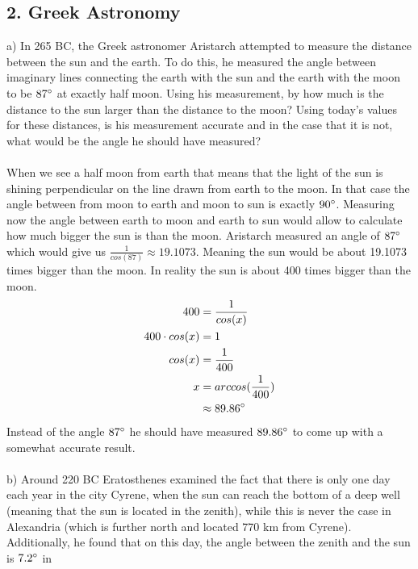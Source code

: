 \subsection*{2. Greek Astronomy}

a) In 265 BC, the Greek astronomer Aristarch attempted to measure the distance between the sun and the
earth. To do this, he measured the angle between imaginary lines connecting the earth with the sun and the
earth with the moon to be $87 \degree$ at exactly half moon. Using his measurement, by how much is the
distance to the sun larger than the distance to the moon? Using today's values for these distances, is his
measurement accurate and in the case that it is not, what would be the angle he should have measured?\\
\\
When we see a half moon from earth that means that the light of the sun is shining perpendicular on the
line drawn from earth to the moon. In that case the angle between from moon to earth and moon to sun is
exactly $90 \degree$. Measuring now the angle between earth to moon and earth to sun would allow to 
calculate how much bigger the sun is than the moon. Aristarch measured an angle of $87 \degree$ which
would give us $\frac{1}{cos(87)} \approx 19.1073$. Meaning the sun would be about 19.1073 times bigger
than the moon. In reality the sun is about 400 times bigger than the moon.
\begin{equation*}
    \begin{split}
        400 &= \frac{1}{cos(x)}\\
        400 \cdot cos(x) &= 1\\
        cos(x) &= \frac{1}{400}\\
        x &= arccos(\frac{1}{400})\\
        &\approx 89.86 \degree\\
    \end{split}
\end{equation*}
Instead of the angle $87 \degree$ he should have measured $89.86 \degree$ to come up with a somewhat
accurate result.\\
\\
\noindent
b) Around 220 BC Eratosthenes examined the fact that there is only one day each year in the city Cyrene,
when the sun can reach the bottom of a deep well (meaning that the sun is located in the zenith), while
this is never the case in Alexandria (which is further north and located 770 km from Cyrene). 
Additionally, he found that on this day, the angle between the zenith and the sun is $7.2 \degree$ in
